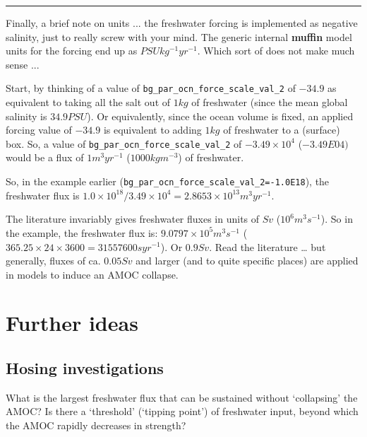 \documentclass[11pt,fleqn]{book} %
\begin{document}
\hfill \break
\noindent\rule{4cm}{0.1mm}
\hfill \break

\noindent Finally, a brief note on units ... the freshwater forcing is implemented as negative salinity, just to really screw with your mind. The generic internal \textbf{muffin} model units for the forcing end up as \(PSU kg^{-1} yr^{-1}\). Which sort of does not make much sense ...

Start, by thinking of a value of \texttt{bg\_par\_ocn\_force\_scale\_val\_2} of \(-34.9\) as equivalent to taking all the salt out of \(1 kg\) of freshwater (since the mean global salinity is \(34.9 PSU\)). Or equivalently, since the ocean volume is fixed, an applied forcing value of \(-34.9\) is equivalent to adding \(1 kg\) of freshwater to a (surface) box. So, a value of \texttt{bg\_par\_ocn\_force\_scale\_val\_2} of \(-3.49\times10^{4}\) (\(-3.49E04)\) would be a flux of \(1 m^{3} yr^{-1}\) (\(1000 kg m^{-3}\)) of freshwater.

So, in the example earlier (\texttt{bg\_par\_ocn\_force\_scale\_val\_2=-1.0E18}), the freshwater flux is \(1.0\times10^{18}/3.49\times10^{4} = 2.8653\times10^{13} m^{3} yr^{-1}\).

The literature invariably gives freshwater fluxes in units of \(Sv\) (\(10^{6} m^{3} s^{-1}\)). So in the example, the freshwater flux is: \(9.0797\times10^{5} m^{3} s^{-1}\) (\(365.25\times24\times3600 = 31557600 s yr^{-1}\)). Or \(0.9 Sv\). Read the literature … but generally, fluxes of ca. \(0.05 Sv\) and larger (and to quite specific places) are applied in models to induce an AMOC collapse.


\newpage


\section{Further ideas}


\subsection{Hosing investigations}

What is the largest freshwater flux that can be sustained without ‘collapsing’ the AMOC? Is there a ‘threshold’ (‘tipping point’) of freshwater input, beyond which the AMOC rapidly decreases in strength?
\end{document}
